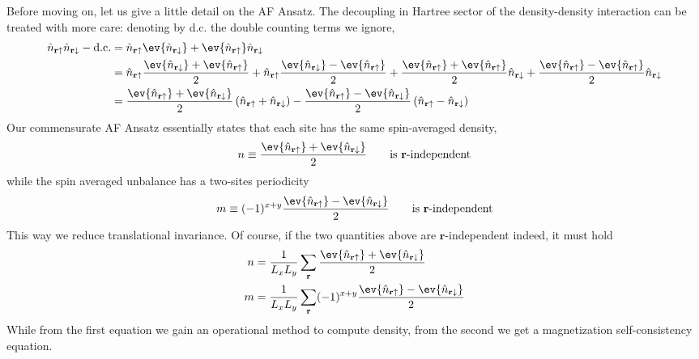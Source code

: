 Before moving on, let us give a little detail on the AF Ansatz. The decoupling in Hartree sector of the density-density interaction can be treated with more care: denoting by d.c. the double counting terms we ignore,
\[
\begin{aligned}
	\hat n_{\mathbf{r}\uparrow} \hat n_{\mathbf{r}\downarrow} - \mathrm{d.c.} &=
	\hat n_{\mathbf{r}\uparrow} \ev{\hat n_{\mathbf{r}\downarrow}} + \ev{\hat n_{\mathbf{r}\uparrow}} \hat n_{\mathbf{r}\downarrow} \\
	&= 
	\hat n_{\mathbf{r}\uparrow} \frac{\ev{\hat n_{\mathbf{r}\downarrow}} + \ev{\hat n_{\mathbf{r}\uparrow}}}{2} + \hat n_{\mathbf{r}\uparrow} \frac{\ev{\hat n_{\mathbf{r}\downarrow}} - \ev{\hat n_{\mathbf{r}\uparrow}}}{2} 
	+
	\frac{\ev{\hat n_{\mathbf{r}\uparrow}} + \ev{\hat n_{\mathbf{r}\uparrow}}}{2} \hat n_{\mathbf{r}\downarrow} + \frac{\ev{\hat n_{\mathbf{r}\uparrow}} - \ev{\hat n_{\mathbf{r}\uparrow}}}{2} \hat n_{\mathbf{r}\downarrow} \\
	&= \frac{\ev{\hat n_{\mathbf{r}\uparrow}} + \ev{\hat n_{\mathbf{r}\downarrow}}}{2} \left(
		\hat n_{\mathbf{r}\uparrow} + \hat n_{\mathbf{r}\downarrow}
	\right) - \frac{\ev{\hat n_{\mathbf{r}\uparrow}} - \ev{\hat n_{\mathbf{r}\downarrow}}}{2} \left(
		\hat n_{\mathbf{r}\uparrow} - \hat n_{\mathbf{r}\downarrow}
	\right)
\end{aligned}
\]
Our commensurate AF Ansatz essentially states that each site has the same spin-averaged density,
\[
	n \equiv \frac{\ev{\hat n_{\mathbf{r}\uparrow}} + \ev{\hat n_{\mathbf{r}\downarrow}}}{2}
	\qquad
	\text{is $\mathbf{r}$-independent}
\]
while the spin averaged unbalance has a two-sites periodicity
\[
	m \equiv (-1)^{x+y} \frac{\ev{\hat n_{\mathbf{r}\uparrow}} - \ev{\hat n_{\mathbf{r}\downarrow}}}{2}
	\qquad
	\text{is $\mathbf{r}$-independent}
\]
This way we reduce translational invariance. Of course, if the two quantities above are $\mathbf{r}$-independent indeed, it must hold
\begin{align}
	n &= \frac{1}{L_x L_y} \sum_\mathbf{r} \frac{\ev{\hat n_{\mathbf{r}\uparrow}} + \ev{\hat n_{\mathbf{r}\downarrow}}}{2} \label{appeq:af-hm-n-self-consistency-implicit}\\
	m &= \frac{1}{L_x L_y} \sum_\mathbf{r} (-1)^{x+y} \frac{\ev{\hat n_{\mathbf{r}\uparrow}} - \ev{\hat n_{\mathbf{r}\downarrow}}}{2} \label{appeq:af-hm-m-self-consistency-implicit}
\end{align}
While from the first equation we gain an operational method to compute density, from the second we get a magnetization self-consistency equation.

